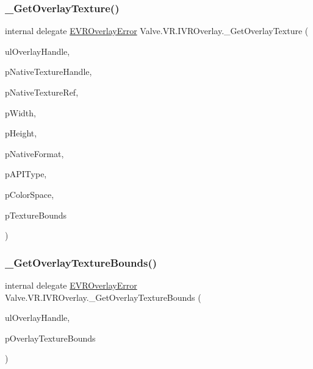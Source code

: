 \subsubsection{\texorpdfstring{\_GetOverlayTexture()}{\_GetOverlayTexture()}}
{\footnotesize\ttfamily internal delegate \mbox{\hyperlink{namespace_valve_1_1_v_r_aaee5c5144f42b7969d45b854f51b0c18}{E\+V\+R\+Overlay\+Error}} Valve.\+V\+R.\+I\+V\+R\+Overlay.\+\_\+\+Get\+Overlay\+Texture (\begin{DoxyParamCaption}\item[{ulong}]{ul\+Overlay\+Handle,  }\item[{ref Int\+Ptr}]{p\+Native\+Texture\+Handle,  }\item[{Int\+Ptr}]{p\+Native\+Texture\+Ref,  }\item[{ref uint}]{p\+Width,  }\item[{ref uint}]{p\+Height,  }\item[{ref uint}]{p\+Native\+Format,  }\item[{ref \mbox{\hyperlink{namespace_valve_1_1_v_r_a9481de640e411eef49c2f3fdca82eaa3}{E\+Texture\+Type}}}]{p\+A\+P\+I\+Type,  }\item[{ref \mbox{\hyperlink{namespace_valve_1_1_v_r_aeb0fba37ba28d8ca276d7c10f01809ac}{E\+Color\+Space}}}]{p\+Color\+Space,  }\item[{ref \mbox{\hyperlink{struct_valve_1_1_v_r_1_1_v_r_texture_bounds__t}{V\+R\+Texture\+Bounds\+\_\+t}}}]{p\+Texture\+Bounds }\end{DoxyParamCaption})}

\mbox{\label{struct_valve_1_1_v_r_1_1_i_v_r_overlay_afae80e32021ddd3855f12f12aa5a0022}} 
\subsubsection{\texorpdfstring{\_GetOverlayTextureBounds()}{\_GetOverlayTextureBounds()}}
{\footnotesize\ttfamily internal delegate \mbox{\hyperlink{namespace_valve_1_1_v_r_aaee5c5144f42b7969d45b854f51b0c18}{E\+V\+R\+Overlay\+Error}} Valve.\+V\+R.\+I\+V\+R\+Overlay.\+\_\+\+Get\+Overlay\+Texture\+Bounds (\begin{DoxyParamCaption}\item[{ulong}]{ul\+Overlay\+Handle,  }\item[{ref \mbox{\hyperlink{struct_valve_1_1_v_r_1_1_v_r_texture_bounds__t}{V\+R\+Texture\+Bounds\+\_\+t}}}]{p\+Overlay\+Texture\+Bounds }\end{DoxyParamCaption})}

